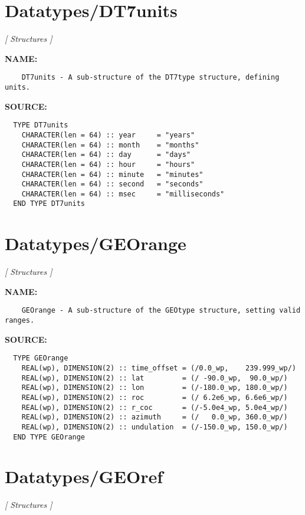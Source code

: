 \section{Datatypes/DT7units}
\textsl{[ Structures ]}

\label{ch:robo24}
\label{ch:Datatypes_DT7units}
\textbf{NAME:}\hspace{0.08in}\begin{Verbatim}
    DT7units - A sub-structure of the DT7type structure, defining units.
\end{Verbatim}
\textbf{SOURCE:}\hspace{0.08in}\begin{Verbatim}
  TYPE DT7units
    CHARACTER(len = 64) :: year     = "years"
    CHARACTER(len = 64) :: month    = "months"
    CHARACTER(len = 64) :: day      = "days"
    CHARACTER(len = 64) :: hour     = "hours"
    CHARACTER(len = 64) :: minute   = "minutes"
    CHARACTER(len = 64) :: second   = "seconds"
    CHARACTER(len = 64) :: msec     = "milliseconds"
  END TYPE DT7units
\end{Verbatim}
\section{Datatypes/GEOrange}
\textsl{[ Structures ]}

\label{ch:robo25}
\label{ch:Datatypes_GEOrange}
\textbf{NAME:}\hspace{0.08in}\begin{Verbatim}
    GEOrange - A sub-structure of the GEOtype structure, setting valid ranges.
\end{Verbatim}
\textbf{SOURCE:}\hspace{0.08in}\begin{Verbatim}
  TYPE GEOrange
    REAL(wp), DIMENSION(2) :: time_offset = (/0.0_wp,    239.999_wp/)
    REAL(wp), DIMENSION(2) :: lat         = (/ -90.0_wp,  90.0_wp/)
    REAL(wp), DIMENSION(2) :: lon         = (/-180.0_wp, 180.0_wp/)
    REAL(wp), DIMENSION(2) :: roc         = (/ 6.2e6_wp, 6.6e6_wp/)
    REAL(wp), DIMENSION(2) :: r_coc       = (/-5.0e4_wp, 5.0e4_wp/)
    REAL(wp), DIMENSION(2) :: azimuth     = (/   0.0_wp, 360.0_wp/)
    REAL(wp), DIMENSION(2) :: undulation  = (/-150.0_wp, 150.0_wp/)
  END TYPE GEOrange
\end{Verbatim}
\section{Datatypes/GEOref}
\textsl{[ Structures ]}


